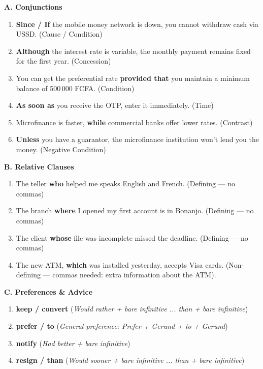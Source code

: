 \documentclass[11pt]{article}
\begin{document}
\begin{corrige}[Exercice 4.4]
\textbf{A. Conjunctions}
\begin{enumerate}
    \item \textbf{Since / If} the mobile money network is down, you cannot withdraw cash via USSD. (Cause / Condition)
    \item \textbf{Although} the interest rate is variable, the monthly payment remains fixed for the first year. (Concession)
    \item You can get the preferential rate \textbf{provided that} you maintain a minimum balance of 500\,000 FCFA. (Condition)
    \item \textbf{As soon as} you receive the OTP, enter it immediately. (Time)
    \item Microfinance is faster, \textbf{while} commercial banks offer lower rates. (Contrast)
    \item \textbf{Unless} you have a guarantor, the microfinance institution won't lend you the money. (Negative Condition)
\end{enumerate}

\textbf{B. Relative Clauses}
\begin{enumerate}
    \item The teller \textbf{who} helped me speaks English and French. (Defining --- no commas)
    \item The branch \textbf{where} I opened my first account is in Bonanjo. (Defining --- no commas)
    \item The client \textbf{whose} file was incomplete missed the deadline. (Defining --- no commas)
    \item The new ATM, \textbf{which} was installed yesterday, accepts Visa cards. (Non-defining --- commas needed: extra information about the ATM).
\end{enumerate}

\textbf{C. Preferences \& Advice}
\begin{enumerate}
    \item \textbf{keep / convert} (\textit{Would rather + bare infinitive ... than + bare infinitive})
    \item \textbf{prefer / to} (\textit{General preference: Prefer + Gerund + to + Gerund})
    \item \textbf{notify} (\textit{Had better + bare infinitive})
    \item \textbf{resign / than} (\textit{Would sooner + bare infinitive ... than + bare infinitive})
\end{enumerate}


\end{corrige}
\end{document}

